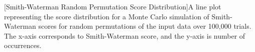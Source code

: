 [Smith-Waterman Random Permutation Score Distribution]A line plot representing the score distribution for a Monte Carlo simulation of Smith-Waterman scores for random permutations of the input data over 100,000 trials. The x-axis corresponds to Smith-Waterman score, and the y-axis is number of occurrences.